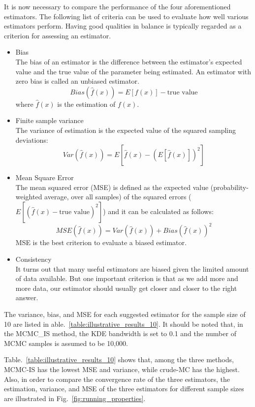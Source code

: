     It is now necessary to compare the performance of the four aforementioned estimators. The following list of criteria can be used to evaluate how well various estimators perform. Having good qualities in balance is typically regarded as a criterion for assessing an estimator.
    \begin{itemize}[leftmargin=*]
      \item Bias\\
        The bias of an estimator is the difference between the estimator's expected value and the true value of the parameter being estimated. An estimator with zero bias is called an unbiased estimator.
        $$
        Bias(\widehat{f}(x))=E[f(x)]-\text{true value}
        $$
        where $\widehat{f}(x)$ is the estimation of $f(x)$.
      \item Finite sample variance\\
      The variance of estimation is the expected value of the squared sampling deviations: 
        $$
        Var(\widehat{f}(x))=E[\widehat{f}(x)-(E[\widehat{f}(x)])^2]
        $$
      \item Mean Square Error\\
        The mean squared error (MSE) is defined as the expected value (probability-weighted average, over all samples) of the squared errors ($E[(\widehat{f}(x)-\text{true value})^{2}]$) and it can be calculated as follows: 
        $$ 
        MSE(\widehat{f}(x))=Var(\widehat{f}(x))+Bias(\widehat{f}(x))^{2}
        $$
        MSE is the best criterion to evaluate a biased estimator.
        \item Consistency\\
        It turns out that many useful estimators are biased given the limited amount of data available. But one important criterion is that as we add more and more data, our estimator should usually get closer and closer to the right answer.
    \end{itemize}

    The variance, bias, and MSE for each suggested estimator for the sample size of 10 are listed in able.~\ref{table:illustrative_results_10}. It should be noted that, in the MCMC\_IS method, the KDE bandwidth is set to 0.1 and the number of MCMC samples is assumed to be 10,000.

    
    

    Table.~\ref{table:illustrative_results_10} shows that, among the three methods, MCMC-IS has the lowest MSE and variance, while crude-MC has the highest. \\
    Also, in order to compare the convergence rate of the three estimators, the estimation, variance, and MSE of the three estimators for different sample sizes are illustrated in Fig.~\ref{fig:running_properties}.\\

    
    

    
        
        
